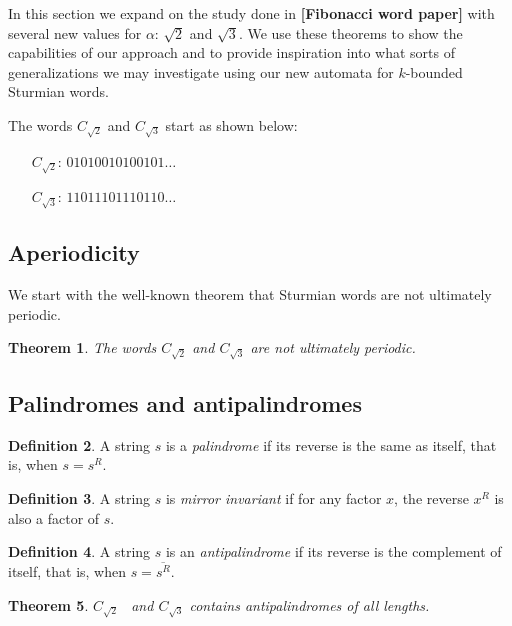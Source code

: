 \documentclass[a4paper]{article}
\newcommand{\reed}[1]{{\color{magenta}\bfseries [#1]}}
\newcommand{\word}{word\xspace}
\newcommand{\Ctwo}{\ensuremath{C_{\sqrt{2}}}}
\newcommand{\Cthree}{\ensuremath{C_{\sqrt{3}}}}
\theoremstyle{definition}
\newtheorem{definition}{Definition}[section]
\theoremstyle{remark}
\theoremstyle{remark}
\theoremstyle{plain}
\newtheorem{theorem}[definition]{Theorem}
\begin{document}
In this section we expand on the study done in \reed{Fibonacci word paper} with several new values for $\alpha$: $\sqrt{2}$ and $\sqrt{3}$.
We use these theorems to show the capabilities of our approach and to provide inspiration into what sorts of generalizations we may investigate using our new automata for $k$-bounded Sturmian words.

The words $\Ctwo$ and $\Cthree$ start as shown below:

\begin{itemize}
    \item[$\Ctwo$:] $01010010100101 \ldots$
    \item[$\Cthree$:] $11011101110110 \ldots$
\end{itemize}

\subsection{Aperiodicity}

We start with the well-known theorem that Sturmian words are not ultimately periodic.

\begin{theorem}\label{thm:ulti_period_C}
The \word{}s $\Ctwo$ and $\Cthree$ are not ultimately periodic.
\end{theorem}

\subsection{Palindromes and antipalindromes}

\begin{definition}
A string $s$ is a \emph{palindrome} if its reverse is the same as itself, that is, when $s = s^R$.
\end{definition}

\begin{definition}
A string $s$ is \emph{mirror invariant} if for any factor $x$, the reverse $x^R$ is also a factor of $s$.
\end{definition}

\begin{definition}
A string $s$ is an \emph{antipalindrome} if its reverse is the complement of itself, that is, when $s = \overline{s^R}$.
\end{definition}

\begin{theorem}
$\Ctwo$~ and $\Cthree$ contains antipalindromes of all lengths.
\end{theorem}
\end{document}

